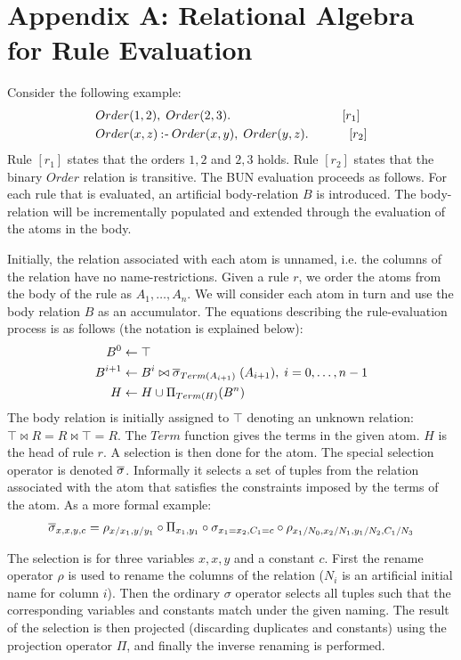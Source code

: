 \section{Appendix A: Relational Algebra for Rule Evaluation}
Consider the following example:
\begin{align*}
&Order(1, 2),\; Order(2, 3). \quad\quad\quad\quad\quad\quad\quad\quad\quad[r_1]\\
&Order(x, z) \mathbin{:\hspace{-0.5ex}\textsf{-}} Order(x, y),\; Order(y, z). \;\quad\quad\quad[r_2]
\end{align*}
\noindent
Rule $[r_1]$ states that the orders $1, 2$ and $2, 3$ holds. Rule $[r_2]$ states that the binary $Order$ relation is transitive. The BUN evaluation proceeds as follows. For each rule that is evaluated, an artificial body-relation $B$ is introduced. The body-relation will be incrementally populated and extended through the evaluation of the atoms in the body. 

Initially, the relation associated with each atom is unnamed, i.e. the columns of the relation have no name-restrictions. Given a rule $r$, we order the atoms from the body of the rule as $A_1, \ldots, A_n$. We will consider each atom in turn and use the body relation $B$ as an accumulator. The equations describing the rule-evaluation process is as follows (the notation is explained below):
\begin{align*}
B^{0} &\leftarrow \top \\
B^{i + 1} &\leftarrow B^{i} \bowtie \overline{\sigma}_{Term(A_{i + 1})}\;(A_{i + 1}), \; i = 0, \ldots, n - 1\\
H & \leftarrow H \cup \Pi_{Term(H)}(B^n)
\end{align*}
\noindent
The body relation is initially assigned to $\top$ denoting an unknown relation: $\top \bowtie R = R \bowtie \top = R$. The $Term$ function gives the terms in the given atom. $H$ is the head of rule $r$. A selection is then done for the atom. The special selection operator is denoted $\overline{\sigma}$. Informally it selects a set of tuples from the relation associated with the atom that satisfies the constraints imposed by the terms of the atom. As a more formal example:
\begin{align*}
\overline{\sigma}_{x,x,y,c} = \rho_{x/x_1, y/y_1} \circ \Pi_{x_1, y_1} \circ \sigma_{x_1 = x_2, C_1 = c} \circ \rho_{x_1/N_0, x_2/N_1, y_1/N_2, C_1/N_3}
\end{align*}

The selection is for three variables $x, x, y$ and a constant $c$. First the rename operator $\rho$ is used to rename the columns of the relation ($N_i$ is an artificial initial name for column $i$). Then the ordinary $\sigma$ operator selects all tuples such that the corresponding variables and constants match under the given naming. The result of the selection is then projected (discarding duplicates and constants) using the projection operator $\Pi$, and finally the inverse renaming is performed.

